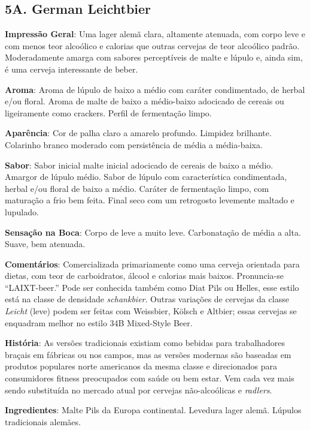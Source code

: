 \subsection*{5A. German Leichtbier}
\textbf{Impressão Geral}: Uma lager alemã clara, altamente atenuada, com corpo leve e com menos teor alcoólico e calorias que outras cervejas de teor alcoólico padrão. Moderadamente amarga com sabores perceptíveis de malte e lúpulo e, ainda sim, é uma cerveja interessante de beber.

\textbf{Aroma}: Aroma de lúpulo de baixo a médio com caráter condimentado, de herbal e/ou floral. Aroma de malte de baixo a médio-baixo adocicado de cereais ou ligeiramente como crackers. Perfil de fermentação limpo.

\textbf{Aparência}: Cor de palha claro a amarelo profundo. Limpidez brilhante. Colarinho branco moderado com persistência de média a média-baixa.

\textbf{Sabor}: Sabor inicial malte inicial adocicado de cereais de baixo a médio. Amargor de lúpulo médio. Sabor de lúpulo com característica condimentada, herbal e/ou floral de baixo a médio. Caráter de fermentação limpo, com maturação a frio bem feita. Final seco com um retrogosto levemente maltado e lupulado.

\textbf{Sensação na Boca}: Corpo de leve a muito leve. Carbonatação de média a alta. Suave, bem atenuada.

\textbf{Comentários}: Comercializada primariamente como uma cerveja orientada para dietas, com teor de carboidratos, álcool e calorias mais baixos. Pronuncia-se “LAIXT-beer.” Pode ser conhecida também como Diat Pils ou Helles, esse estilo está na classe de densidade \textit{schankbier}. Outras variações de cervejas da classe \textit{Leicht} (leve) podem ser feitas com Weissbier, Kölsch e Altbier; essas cervejas se enquadram melhor no estilo 34B Mixed-Style Beer.

\textbf{História}: As versões tradicionais existiam como bebidas para trabalhadores braçais em fábricas ou nos campos, mas as versões modernas são baseadas em produtos populares norte americanos da mesma classe e direcionados para consumidores fitness preocupados com saúde ou bem estar. Vem cada vez mais sendo substituída no mercado atual por cervejas não-alcoólicas e \textit{radlers}.

\textbf{Ingredientes}: Malte Pils da Europa continental. Levedura lager alemã. Lúpulos tradicionais alemães.

